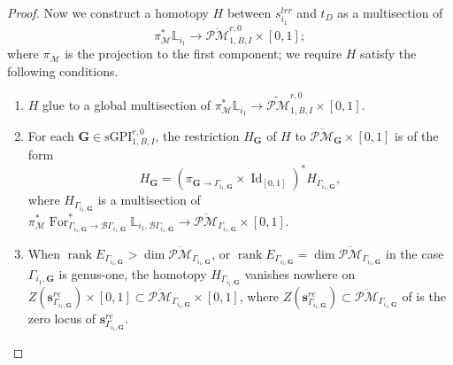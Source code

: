 \documentclass[11pt]{amsart}
\theoremstyle{definition}
\theoremstyle{remark}
\newcommand{\oPMb}{{\overline{\mathcal{PM}}}}
\newcommand{\nontilde}{}
\newcommand{\<}{\left<}
\renewcommand{\>}{\right>}
\numberwithin{equation}{section}
\DeclareMathOperator{\Id}{Id}
\DeclareMathOperator{\rk}{rank}
\def\sGPI{\text{sGPI}}
\begin{document}
\begin{proof}
        Now we construct a homotopy $H$ between $\nontilde{s}^{trr}_{i_1}$ and $t_D$ as a multisection of 
        $$\pi^*_{\mathcal M}\mathbb L_{i_1}\to \oPMb^{r,0}_{1,B,I}\times[0,1];$$ 
        where $\pi_{\mathcal M}$ is the projection to the first component; we require $H$ satisfy the following conditions.
       \begin{enumerate}
            \item $H$ glue to a global multisection of $\pi^*_{\mathcal M}\mathbb L_{i_1}\to \widetilde{\mathcal{PM}}^{r,0}_{1,B,I}\times[0,1]$.
            \item For each $\bm{G}\in \sGPI^{r,0}_{1,B,I}$, the restriction $H_{\bm{G}}$ of $H$ to $\oPMb_{\bm{G}}\times [0,1]$ is of the form 
           \begin{equation}\label{eq homotopy is pulled back}
            H_{\bm{G}}= (\pi_{\bm{G}\to \Gamma_{i_1,\bm{G}}}\times \Id_{[0,1]})^* H_{\Gamma_{i_1,\bm{G}}},
            \end{equation}
            where $H_{\Gamma_{i_1,\bm{G}}}$ is a multisection of $\pi^*_{\mathcal M} \operatorname{For}^*_{\Gamma_{i_1,\bm{G}}\to \mathcal B \Gamma_{i_1,\bm{G}}}\mathbb L_{i_1,\mathcal B \Gamma_{i_1,\bm{G}}}\to \oPMb_{\Gamma_{i_1,\bm{G}}}\times [0,1]$. 
            \item 
            When $\rk E_{\Gamma_{i_1,\bm{G}}}> \dim \oPMb_{\Gamma_{i_1,\bm{G}}}$, or $\rk E_{\Gamma_{i_1,\bm{G}}}= \dim \oPMb_{\Gamma_{i_1,\bm{G}}}$ in the case $\Gamma_{i_1,\bm{G}}$ is genus-one, the homotopy $H_{\Gamma_{i_1,\bm{G}}}$ vanishes nowhere on $Z\left(\bm{s}^{re}_{\Gamma_{i_1,\bm{G}}}\right)\times [0,1]\subset \oPMb_{\Gamma_{i_1,\bm{G}}}\times [0,1]$,
            where $Z\left(\bm{s}^{re}_{\Gamma_{i_1,\bm{G}}}\right)\subset \oPMb_{{\Gamma_{i_1,\bm{G}}}}$ of is the zero locus of $\bm{s}^{re}_{\Gamma_{i_1,\bm{G}}}$.
        \end{enumerate}


\end{proof}
\end{document}
